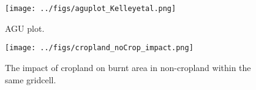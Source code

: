 \begin{figure}[!ht]
  \centering
    \texttt{[image: ../figs/aguplot\_Kelleyetal.png]}

  \caption{AGU plot.}
\end{figure}


\begin{figure}[!ht]
  \centering
    \texttt{[image: ../figs/cropland\_noCrop\_impact.png]}

  \caption{The impact of cropland on burnt area in non-cropland within the same gridcell.}
\end{figure}
